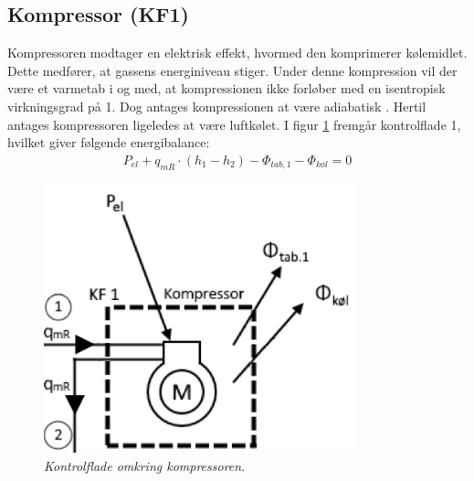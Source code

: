 \documentclass[../Hovedrapport.tex]{subfiles}
\begin{document}
\subsection{Kompressor (KF1)}
\begin{minipage}[t]{0.5\textwidth}
Kompressoren modtager en elektrisk effekt, hvormed den komprimerer kølemidlet. Dette medfører, at gassens energiniveau stiger. Under denne kompression vil der være et varmetab i og med, at kompressionen ikke forløber med en isentropisk virkningsgrad på 1. Dog antages kompressionen at være adiabatisk \citep{termo}. Hertil antages kompressoren ligeledes at være luftkølet.
I figur \ref{fig:Kompressor_KF} fremgår kontrolflade 1, hvilket giver følgende energibalance:
\begin{align}
\label{eq:kompressorEB}
    P_{el}+q_{mR} \cdot (h_{1}-h_{2})-\Phi_{tab,1}-\Phi_{\textit{køl}} = 0
\end{align}
\end{minipage}
\begin{minipage}[t]{0.5\textwidth}
\vspace{-30pt}
\begin{figure}[H]
\centering
	\includegraphics[width=0.8\textwidth]{Billeder/KF_1.png}
	\caption{\textit{Kontrolflade omkring kompressoren}.}
	\label{fig:Kompressor_KF}
\end{figure}
\end{minipage}
\end{document}
